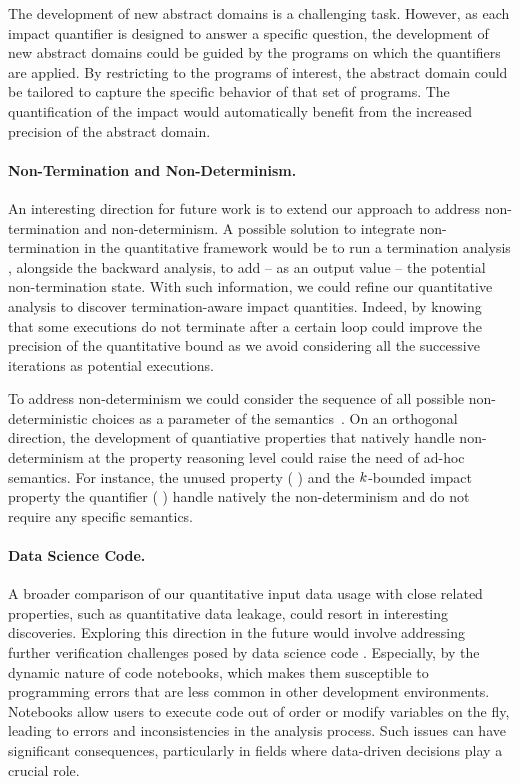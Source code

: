The development of new abstract domains is a challenging task.
However, as each impact quantifier is designed to answer a specific question, the development of new abstract domains could be guided by the programs on which the quantifiers are applied.
By restricting to the programs of interest, the abstract domain could be tailored to capture the specific behavior of that set of programs.
The quantification of the impact would automatically benefit from the increased precision of the abstract domain.

\paragraph{Non-Termination and Non-Determinism.}

An interesting direction for future work is to extend our approach to address non-termination and non-determinism.
A possible solution to integrate non-termination in the quantitative framework would be to run a termination analysis , alongside the backward analysis, to add -- as an output value -- the potential non-termination state.
With such information, we could refine our quantitative analysis to discover termination-aware impact quantities.
Indeed, by knowing that some executions do not terminate after a certain loop could improve the precision of the quantitative bound as we avoid considering all the successive iterations as potential executions.

To address non-determinism we could consider the sequence of all possible non-deterministic choices as a parameter of the semantics~.
On an orthogonal direction, the development of quantiative properties that natively handle non-determinism at the property reasoning level could raise the need of ad-hoc semantics. For instance, the unused property (\cf{} ) and the $k$-bounded impact property \wrt{} the \qusedname{} quantifier (\cf{} ) handle natively the non-determinism and do not require any specific semantics.

\paragraph{Data Science Code.}

A broader comparison of our quantitative input data usage with close related properties, such as quantitative data leakage, could resort in interesting discoveries.
Exploring this direction in the future would involve addressing further verification challenges posed by data science code . Especially, by the dynamic nature of code notebooks, which makes them susceptible to programming errors that are less common in other development environments. Notebooks allow users to execute code out of order or modify variables on the fly, leading to errors and inconsistencies in the analysis process. Such issues can have significant consequences, particularly in fields where data-driven decisions play a crucial role.

